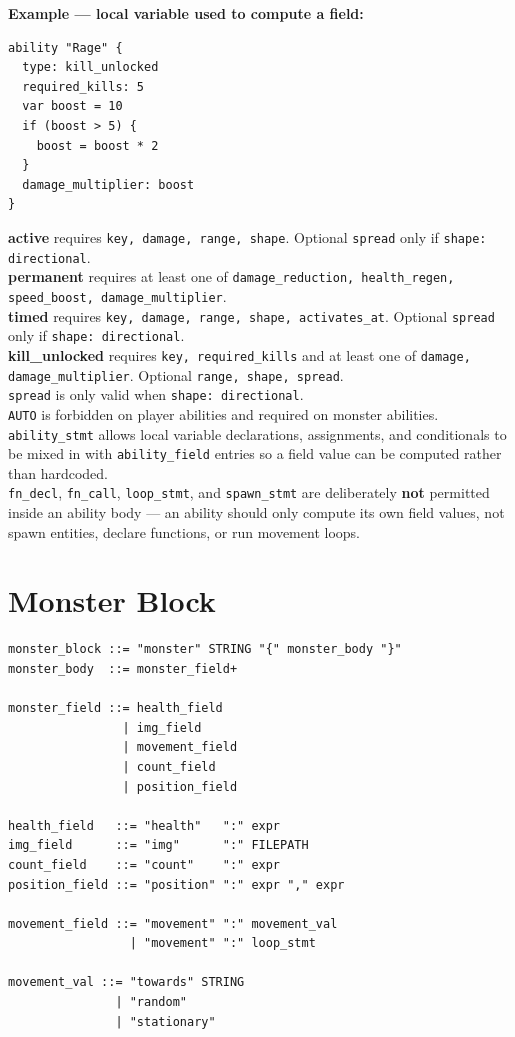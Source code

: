 \documentclass[12pt,a4paper]{article}
\begin{document}
\textbf{Example --- local variable used to compute a field:}
\begin{lstlisting}[style=dsl]
ability "Rage" {
  type: kill_unlocked
  required_kills: 5
  var boost = 10
  if (boost > 5) {
    boost = boost * 2
  }
  damage_multiplier: boost
}
\end{lstlisting}

\begin{cbox}
\textbf{active} requires \texttt{key, damage, range, shape}.
  Optional \texttt{spread} only if \texttt{shape: directional}.\\
\textbf{permanent} requires at least one of
  \texttt{damage\_reduction, health\_regen, speed\_boost, damage\_multiplier}.\\
\textbf{timed} requires \texttt{key, damage, range, shape, activates\_at}.
  Optional \texttt{spread} only if \texttt{shape: directional}.\\
\textbf{kill\_unlocked} requires \texttt{key, required\_kills} and at least one of
  \texttt{damage, damage\_multiplier}. Optional \texttt{range, shape, spread}.\\
\texttt{spread} is only valid when \texttt{shape: directional}.\\
\texttt{AUTO} is forbidden on player abilities and required on monster abilities.\\[4pt]
\texttt{ability\_stmt} allows local variable declarations, assignments, and
conditionals to be mixed in with \texttt{ability\_field} entries so a field
value can be computed rather than hardcoded.\\
\texttt{fn\_decl}, \texttt{fn\_call}, \texttt{loop\_stmt}, and \texttt{spawn\_stmt}
are deliberately \textbf{not} permitted inside an ability body --- an ability
should only compute its own field values, not spawn entities, declare
functions, or run movement loops.
\end{cbox}

\section{Monster Block}

\begin{lstlisting}[style=bnf]
monster_block ::= "monster" STRING "{" monster_body "}"
monster_body  ::= monster_field+

monster_field ::= health_field
                | img_field
                | movement_field
                | count_field
                | position_field

health_field   ::= "health"   ":" expr
img_field      ::= "img"      ":" FILEPATH
count_field    ::= "count"    ":" expr
position_field ::= "position" ":" expr "," expr

movement_field ::= "movement" ":" movement_val
                 | "movement" ":" loop_stmt

movement_val ::= "towards" STRING
               | "random"
               | "stationary"
\end{lstlisting}
\end{document}
